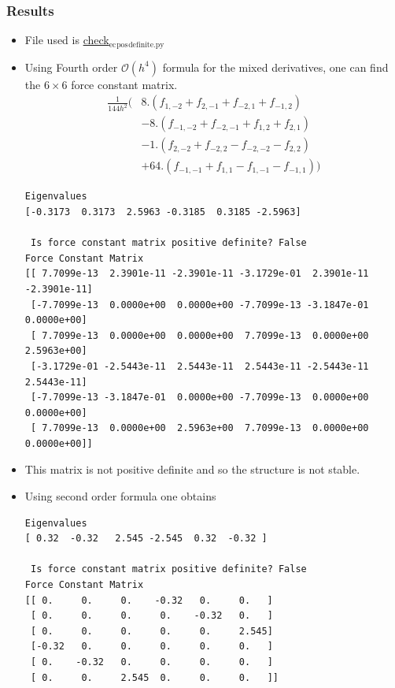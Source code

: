 \documentclass[11pt]{article}
\begin{document}
\subsubsection{Results}
\label{sec:org4ec8bfb}
\begin{itemize}
\item File used is \href{file:///home/tigany/Documents/ti/complete\_titanium/ti\_01-11-18/check\_ec\_pos\_definite/check\_ec\_pos\_definite.py}{check\(_{\text{ec}}\)\(_{\text{pos}}\)\(_{\text{definite.py}}\)}
\item Using Fourth order \(\mathcal{O}(h^{4})\) formula for the mixed
derivatives, one can find the \(6\times6\) force constant matrix.
\begin{align}
  \frac{1}{144 h^2} (     &  8.  (  f_{ 1,-2} +  f_{ 2,-1} + f_{-2, 1} + f_{-1, 2} )\\
                         &-  8.  (  f_{-1,-2} +  f_{-2,-1} + f_{ 1, 2} + f_{ 2, 1} )\\
                         &-  1.  (  f_{ 2,-2} +  f_{-2, 2} - f_{-2,-2} - f_{ 2, 2} )\\
                         &+  64. (  f_{-1,-1} +  f_{ 1, 1} - f_{ 1,-1} - f_{-1, 1} )  )
\end{align}

\begin{verbatim}
Eigenvalues
[-0.3173  0.3173  2.5963 -0.3185  0.3185 -2.5963]

 Is force constant matrix positive definite? False
Force Constant Matrix
[[ 7.7099e-13  2.3901e-11 -2.3901e-11 -3.1729e-01  2.3901e-11 -2.3901e-11]
 [-7.7099e-13  0.0000e+00  0.0000e+00 -7.7099e-13 -3.1847e-01  0.0000e+00]
 [ 7.7099e-13  0.0000e+00  0.0000e+00  7.7099e-13  0.0000e+00  2.5963e+00]
 [-3.1729e-01 -2.5443e-11  2.5443e-11  2.5443e-11 -2.5443e-11  2.5443e-11]
 [-7.7099e-13 -3.1847e-01  0.0000e+00 -7.7099e-13  0.0000e+00  0.0000e+00]
 [ 7.7099e-13  0.0000e+00  2.5963e+00  7.7099e-13  0.0000e+00  0.0000e+00]]
\end{verbatim}

\item This matrix is not positive definite and so the structure is not
stable.

\item Using second order formula one obtains
\begin{verbatim}
Eigenvalues
[ 0.32  -0.32   2.545 -2.545  0.32  -0.32 ]

 Is force constant matrix positive definite? False
Force Constant Matrix
[[ 0.     0.     0.    -0.32   0.     0.   ]
 [ 0.     0.     0.     0.    -0.32   0.   ]
 [ 0.     0.     0.     0.     0.     2.545]
 [-0.32   0.     0.     0.     0.     0.   ]
 [ 0.    -0.32   0.     0.     0.     0.   ]
 [ 0.     0.     2.545  0.     0.     0.   ]]


\end{verbatim}
\end{itemize}
\end{document}
